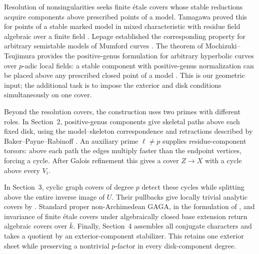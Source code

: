 Resolution of nonsingularities seeks finite \'etale covers whose stable
reductions acquire components above prescribed points of a model.
Tamagawa proved this for points of a stable marked model in mixed
characteristic with residue field algebraic over a finite field
\cite[Theorem~0.2(v)]{TamagawaRNS}. Lepage established the corresponding
property for arbitrary semistable models of Mumford curves
\cite[Theorem~2.7]{LepageRNS}. The theorem of Mochizuki--Tsujimura
provides the positive-genus formulation for arbitrary hyperbolic curves
over $p$-adic local fields: a stable component with positive-genus
normalization can be placed above any prescribed closed point of a model
\cite[Theorem~A and the alternative formulation preceding it]{MochizukiTsujimura}.
This is our geometric input; the additional task is to impose the
exterior and disk conditions simultaneously on one cover.

Beyond the resolution covers, the construction uses two primes with
different roles. In
Section~2, positive-genus components give skeletal paths above each
fixed disk, using the model--skeleton correspondence and retractions
described by Baker--Payne--Rabinoff
\cite[Sections~2--4]{BakerPayneRabinoff}. An auxiliary prime
$\ell\ne p$ supplies residue-component torsors: above each path the
edges multiply faster than the endpoint vertices, forcing a cycle.
After Galois refinement this gives a cover $Z\to X$ with a cycle
above every $V_i$.

In Section~3, cyclic graph covers of degree $p$ detect these cycles
while splitting above the entire inverse image of $U$. Their pullbacks
give locally trivial analytic covers by
\cite[Lemma~2.6]{DeJongCoverings}. Standard proper non-Archimedean
GAGA, in the formulation of \cite[Appendix~A]{GAGA}, and invariance
of finite \'etale covers under algebraically closed base extension
\cite[Expos\'e~X, Corollary~1.8]{SGA1} return algebraic covers over
$\bar k$. Finally, Section~4 assembles all conjugate characters and
takes a quotient by an exterior-component stabilizer. This retains
one exterior sheet while preserving a nontrivial $p$-factor in every
disk-component degree.
